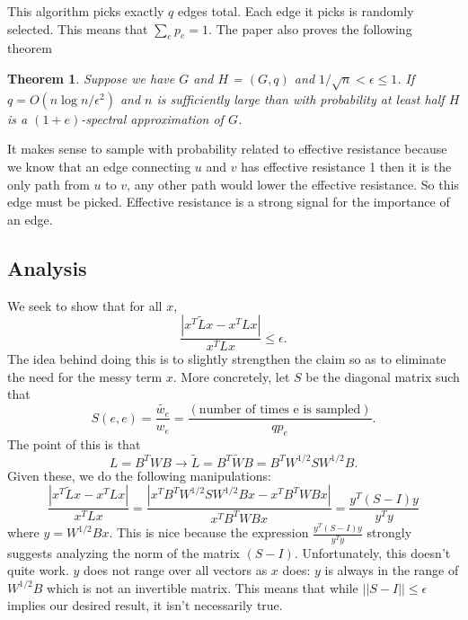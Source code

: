 \documentclass[12pt,twoside]{article}
\newtheorem{thm}{Theorem}
\begin{document}
This algorithm picks exactly $q$ edges total. Each edge it picks is randomly selected. This means that $\sum_e p_e = 1$. The paper also proves the following theorem

\begin{thm}
Suppose we have $G$ and $H$ = $(G, q)$ and $1/\sqrt{n} < \epsilon \leq 1$. If $q=O(n\log n /\epsilon^2)$ and $n$ is sufficiently large than with probability at least half $H$ is a $(1+e)$-spectral approximation of $G$.
\end{thm}

It makes sense to sample with probability related to effective resistance because we know that an edge connecting $u$ and $v$ has effective resistance 1 then it is the only path from $u$ to $v$, any other path would lower the effective resistance. So this edge must be picked. Effective resistance is a strong signal for the importance of an edge. 

\subsection{Analysis}

We seek to show that for all $x$, 
%
\begin{equation*}
\frac{|x^T\tilde{L}x - x^TLx|}{x^TLx} \leq \epsilon.
\end{equation*}
%
The idea behind doing this is to slightly strengthen the claim so as to eliminate the need for the messy term $x$. More concretely, let $S$ be the diagonal matrix such that 
%
\begin{equation}
S(e,e) = \frac{\tilde{w_e}}{w_e} = \frac{(\text{number of times e is sampled})}{qp_e}.
\end{equation}
%
The point of this is that 
%
\begin{equation}
L = B^TWB \rightarrow
\tilde{L} = B^T\tilde{W}B = B^TW^{1/2}SW^{1/2}B.
\end{equation}
%
Given these, we do the following manipulations:
%
\begin{equation*}
\frac{|x^T\tilde{L}x - x^TLx|}{x^TLx} = \frac{|x^TB^TW^{1/2}SW^{1/2}Bx - x^TB^TWBx|}{x^TB^TWBx} = \frac{y^T(S-I)y}{y^Ty}
\end{equation*}
%
where $y = W^{1/2}Bx$. This is nice because the expression $\frac{y^T(S-I)y}{y^Ty}$ strongly suggests analyzing the norm of the matrix $(S-I)$. Unfortunately, this doesn't quite work. $y$ does not range over all vectors as $x$ does: $y$ is always in the range of $W^{1/2}B$ which is not an invertible matrix. This means that while $||S - I|| \leq \epsilon$ implies our desired result, it isn't necessarily true. 
\end{document}
